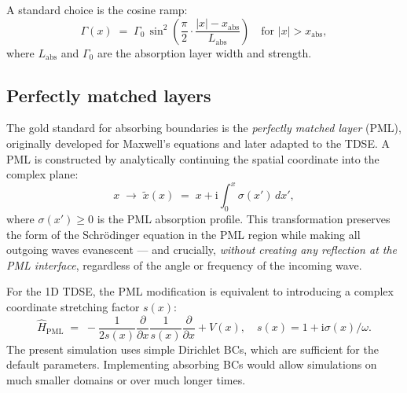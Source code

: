 \documentclass[12pt, a4paper]{article}
\newcommand{\ii}{\mathrm{i}}          %
\newcommand{\Htop}{\hat{H}}
\begin{document}
A standard choice is the cosine ramp:
\begin{equation}
  \Gamma(x) \;=\;
  \Gamma_0\,\sin^2\!\left(\frac{\pi}{2}
  \cdot\frac{|x|-x_\text{abs}}{L_\text{abs}}\right)
  \quad \text{for } |x| > x_\text{abs},
\end{equation}
where $L_\text{abs}$ and $\Gamma_0$ are the absorption layer width and
strength.

\subsection{Perfectly matched layers}

The gold standard for absorbing boundaries is the \emph{perfectly
matched layer} (PML), originally developed for Maxwell's equations
\cite{NumericalRecipes} and later adapted to the TDSE.  A PML is
constructed by analytically continuing the spatial coordinate into the
complex plane:
\begin{equation}
  x \;\to\; \tilde{x}(x) \;=\; x + \ii\int_0^x \sigma(x')\,dx',
\end{equation}
where $\sigma(x') \geq 0$ is the PML absorption profile.  This
transformation preserves the form of the Schr\"{o}dinger equation in
the PML region while making all outgoing waves evanescent — and
crucially, \emph{without creating any reflection at the PML interface},
regardless of the angle or frequency of the incoming wave.

For the 1D TDSE, the PML modification is equivalent to introducing a
complex coordinate stretching factor $s(x)$:
\begin{equation}
  \Htop_\text{PML} \;=\;
  -\frac{1}{2s(x)}\frac{\partial}{\partial x}\frac{1}{s(x)}\frac{\partial}{\partial x}
  + V(x),
  \quad s(x) = 1 + \ii\sigma(x)/\omega.
\end{equation}
The present simulation uses simple Dirichlet BCs, which are sufficient
for the default parameters.  Implementing absorbing BCs would allow
simulations on much smaller domains or over much longer times.
\end{document}
